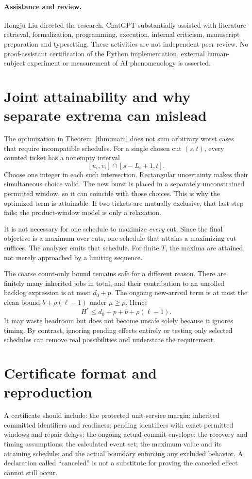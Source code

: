 \paragraph{Assistance and review.}
Hongju Liu directed the research. ChatGPT substantially assisted with literature retrieval, formalization, programming, execution, internal criticism, manuscript preparation and typesetting. These activities are not independent peer review. No proof-assistant certification of the Python implementation, external human-subject experiment or measurement of AI phenomenology is asserted.

\appendix
\section{Joint attainability and why separate extrema can mislead}
The optimization in Theorem~\ref{thm:main} does not sum arbitrary worst cases that require incompatible schedules. For a single chosen cut $(s,t)$, every counted ticket has a nonempty interval
\[
[u_i,v_i]\cap[s-L_i+1,t].
\]
Choose one integer in each such intersection. Rectangular uncertainty makes their simultaneous choice valid. The new burst is placed in a separately unconstrained permitted window, so it can coincide with those choices. This is why the optimized term is attainable. If two tickets are mutually exclusive, that last step fails; the product-window model is only a relaxation.

It is not necessary for one schedule to maximize \emph{every} cut. Since the final objective is a maximum over cuts, one schedule that attains a maximizing cut suffices. The analyzer emits that schedule. For finite $T$, the maxima are attained, not merely approached by a limiting sequence.

The coarse count-only bound remains safe for a different reason. There are finitely many inherited jobs in total, and their contribution to an unrolled backlog expression is at most $d_0+p$. The ongoing new-arrival term is at most the clean bound $b+\rho(\ell-1)$ under $\mu\ge\rho$. Hence
\[
H^*\le d_0+p+b+\rho(\ell-1).
\]
It may waste headroom but does not become unsafe solely because it ignores timing. By contrast, ignoring pending effects entirely or testing only selected schedules can remove real possibilities and understate the requirement.

\section{Certificate format and reproduction}
A certificate should include: the protected unit-service margin; inherited committed identifiers and readiness; pending identifiers with exact permitted windows and repair delays; the ongoing actual-commit envelope; the recovery and timing assumptions; the calculated event set; the maximum value and its attaining schedule; and the actual boundary enforcing any excluded behavior. A declaration called ``canceled'' is not a substitute for proving the canceled effect cannot still occur.

